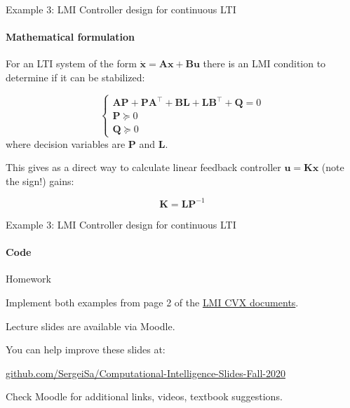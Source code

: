 \documentclass{beamer}
\begin{document}
\begin{frame}{Example 3: LMI Controller design for continuous LTI}
\framesubtitle{Mathematical formulation}
\begin{flushleft}

For an LTI system of the form $\dot{\mathbf{x}} = \mathbf{A}\mathbf{x} + \mathbf{B}\mathbf{u}$ there is an LMI condition to determine if it can be stabilized:

\begin{equation}
    \begin{cases}
        \mathbf{A}\mathbf{P} + \mathbf{P}\mathbf{A}^\top + \mathbf{B}\mathbf{L} + \mathbf{L}\mathbf{B}^\top + \mathbf{Q} = 0 \\
        \mathbf{P} \succeq 0 \\
        \mathbf{Q} \succeq 0 
    \end{cases}
\end{equation}
%
where decision variables are $\mathbf{P}$ and $\mathbf{L}$. 

\bigskip

This gives as a direct way to calculate linear feedback controller $\mathbf{u} = \mathbf{K}\mathbf{x}$ (note the sign!) gains:

\begin{equation}
    \mathbf{K} = \mathbf{L}\mathbf{P}^{-1}
\end{equation}

\end{flushleft}
\end{frame}




\begin{frame}{Example 3: LMI Controller design for continuous LTI}
\framesubtitle{Code}
\begin{flushleft}



\end{flushleft}
\end{frame}





\begin{frame}{Homework}
\begin{flushleft}


Implement both examples from page 2 of the \href{http://stanford.edu/class/ee363/notes/lmi-cvx.pdf}{LMI CVX documents}.

\end{flushleft}
\end{frame}



\begin{frame}
\centerline{Lecture slides are available via Moodle.}
\bigskip
\centerline{You can help improve these slides at:}

\centerline{\href{https://github.com/SergeiSa/Computational-Intelligence-Slides-Fall-2020}{github.com/SergeiSa/Computational-Intelligence-Slides-Fall-2020}}


\bigskip
\centerline{Check Moodle for additional links, videos, textbook suggestions.}
\end{frame}
\end{document}
